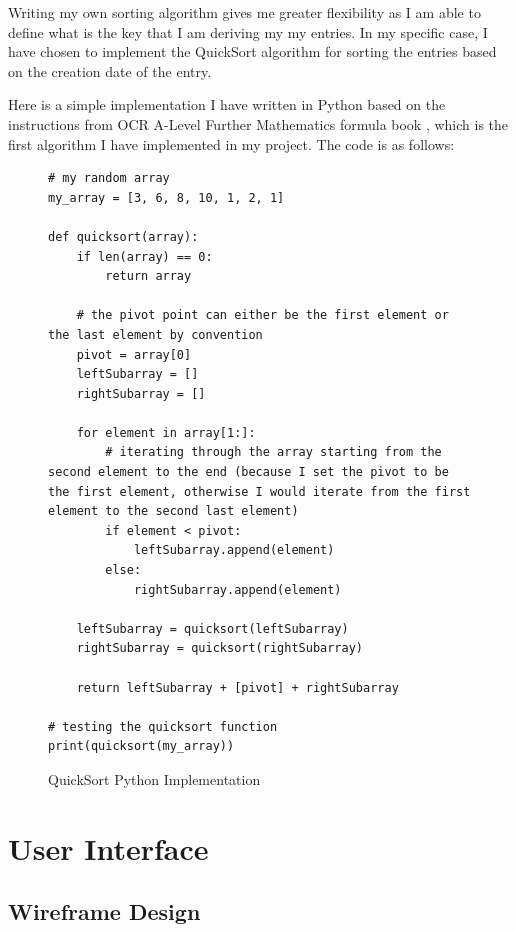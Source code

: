 Writing my own sorting algorithm gives me greater flexibility as I am able to define what is the key that I am deriving my my entries. In my specific case, I have chosen to implement the QuickSort algorithm for sorting the entries based on the creation date of the entry. 

Here is a simple implementation I have written in Python based on the instructions from OCR A-Level Further Mathematics formula book \cite{ocr2019furthermaths}, which is the first algorithm I have implemented in my project. The code is as follows:
\newpage
\begin{figure}[H]
\begin{verbatim}
# my random array
my_array = [3, 6, 8, 10, 1, 2, 1]

def quicksort(array):
    if len(array) == 0:
        return array

    # the pivot point can either be the first element or the last element by convention
    pivot = array[0]
    leftSubarray = []
    rightSubarray = []

    for element in array[1:]:
        # iterating through the array starting from the second element to the end (because I set the pivot to be the first element, otherwise I would iterate from the first element to the second last element)
        if element < pivot:
            leftSubarray.append(element)
        else:
            rightSubarray.append(element)

    leftSubarray = quicksort(leftSubarray)
    rightSubarray = quicksort(rightSubarray)

    return leftSubarray + [pivot] + rightSubarray

# testing the quicksort function
print(quicksort(my_array))
\end{verbatim}
        \caption{QuickSort Python Implementation}
\end{figure}








\section{User Interface}
\subsection{Wireframe Design}

